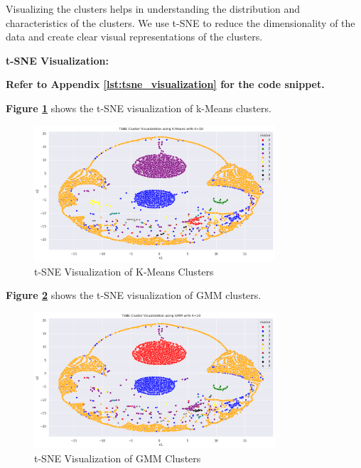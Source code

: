         Visualizing the clusters helps in understanding the distribution and characteristics of the clusters. We use t-SNE to reduce the dimensionality of the data and create clear visual representations of the clusters.

        \textbf{t-SNE Visualization:}
        
        \vspace{0.5em}

        \textbf{Refer to Appendix \ref{lst:tsne_visualization} for the code snippet.}

        \textbf{Figure \ref{fig:tsne-kmeans}} shows the t-SNE visualization of k-Means clusters.

        \begin{figure}[h]
            \centering
            \includegraphics[width=0.8\textwidth]{../figures/plots/section3/tsne_kmeans_clusters.png}
            \caption{t-SNE Visualization of K-Means Clusters}
            \label{fig:tsne-kmeans}
        \end{figure}

        \textbf{Figure \ref{fig:tsne-gmm}} shows the t-SNE visualization of GMM clusters.

        \begin{figure}[h]
            \centering
            \includegraphics[width=0.8\textwidth]{../figures/plots/section3/tsne_gmm_clusters.png}
            \caption{t-SNE Visualization of GMM Clusters}
            \label{fig:tsne-gmm}
        \end{figure}

